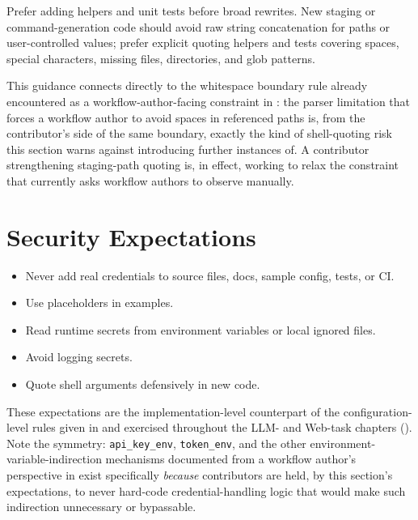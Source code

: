 \begin{practicebox}
Prefer adding helpers and unit tests before broad rewrites. New staging or
command-generation code should avoid raw string concatenation for paths or
user-controlled values; prefer explicit quoting helpers and tests covering
spaces, special characters, missing files, directories, and glob patterns.
\end{practicebox}

This guidance connects directly to the whitespace boundary rule already
encountered as a workflow-author-facing constraint in
: the parser limitation that forces a workflow
author to avoid spaces in referenced paths is, from the contributor's side
of the same boundary, exactly the kind of shell-quoting risk this section
warns against introducing further instances of. A contributor strengthening
staging-path quoting is, in effect, working to relax the constraint that
 currently asks workflow authors to observe
manually.

\section{Security Expectations}

\begin{itemize}[leftmargin=1.4em]
  \item Never add real credentials to source files, docs, sample config,
    tests, or CI.
  \item Use placeholders in examples.
  \item Read runtime secrets from environment variables or local ignored
    files.
  \item Avoid logging secrets.
  \item Quote shell arguments defensively in new code.
\end{itemize}

These expectations are the implementation-level counterpart of the
configuration-level rules given in  and exercised
throughout the LLM- and Web-task chapters ().
Note the symmetry: \texttt{api\_key\_env}, \texttt{token\_env}, and the
other environment-variable-indirection mechanisms documented from a
workflow author's perspective in  exist specifically
\emph{because} contributors are held, by this section's expectations, to
never hard-code credential-handling logic that would make such indirection
unnecessary or bypassable.

